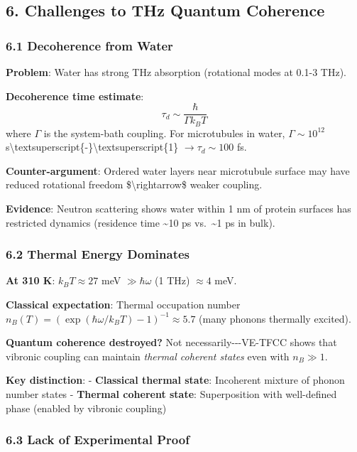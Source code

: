 \subsection{6. Challenges to THz Quantum
Coherence}\label{challenges-to-thz-quantum-coherence}

\subsubsection{6.1 Decoherence from Water}\label{decoherence-from-water}

\textbf{Problem}: Water has strong THz absorption (rotational modes at
0.1-3 THz).

\textbf{Decoherence time estimate}:
\[\tau_d \sim \frac{\hbar}{\Gamma k_B T}\] where \(\Gamma\) is the
system-bath coupling. For microtubules in water, \(\Gamma \sim 10^{12}\)
s\textbackslash textsuperscript\{-\}\textbackslash textsuperscript\{1\}
\(\rightarrow \tau_d \sim 100\) fs.

\textbf{Counter-argument}: Ordered water layers near microtubule surface
may have reduced rotational freedom \$\textbackslash rightarrow\$ weaker
coupling.

\textbf{Evidence}: Neutron scattering shows water within 1 nm of protein
surfaces has restricted dynamics (residence time \textasciitilde10 ps
vs.~\textasciitilde1 ps in bulk).

\subsubsection{6.2 Thermal Energy
Dominates}\label{thermal-energy-dominates}

\textbf{At 310 K}: \(k_B T \approx 27\) meV \(\gg \hbar \omega\) (1 THz)
\(\approx 4\) meV.

\textbf{Classical expectation}: Thermal occupation number
\(n_B(T) = (\exp(\hbar \omega / k_B T) - 1)^{-1} \approx 5.7\) (many
phonons thermally excited).

\textbf{Quantum coherence destroyed?} Not necessarily-\/-\/-VE-TFCC
shows that vibronic coupling can maintain \emph{thermal coherent states}
even with \(n_B \gg 1\).

\textbf{Key distinction}: - \textbf{Classical thermal state}: Incoherent
mixture of phonon number states - \textbf{Thermal coherent state}:
Superposition with well-defined phase (enabled by vibronic coupling)

\subsubsection{6.3 Lack of Experimental
Proof}\label{lack-of-experimental-proof}

